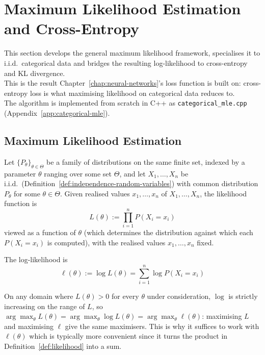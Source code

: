 \section{Maximum Likelihood Estimation and Cross-Entropy}
\label{sec:mle-cross-entropy}
	
	This section develops the general maximum likelihood framework, specialises it to i.i.d.\ categorical data and bridges the resulting log-likelihood to cross-entropy and KL divergence. \\
	
	This is the result Chapter~\ref{chap:neural-networks}'s loss function is built on: cross-entropy loss is what maximising likelihood on categorical data reduces to. \\
	
	The algorithm is implemented from scratch in C++ as \texttt{categorical\_mle.cpp} (Appendix~\ref{app:categorical-mle}).
	
	\subsection{Maximum Likelihood Estimation}
		
		\begin{definition}
			\label{def:likelihood}
			Let $\{P_\theta\}_{\theta\in\Theta}$ be a family of distributions on the same finite set, indexed by a parameter $\theta$ ranging over some set $\Theta$, and let $X_1,\dots,X_n$ be i.i.d.\ (Definition~\ref{def:independence-random-variables}) with common distribution $P_\theta$ for some $\theta\in\Theta$. Given realised values $x_1,\dots,x_n$ of $X_1,\dots,X_n$, the likelihood function is
			\[
				L(\theta) := \prod_{i=1}^n P(X_i=x_i)
			\]
			viewed as a function of $\theta$ (which determines the distribution against which each $P(X_i=x_i)$ is computed), with the realised values $x_1,\dots,x_n$ fixed.
		\end{definition}
		
		\begin{definition}
			\label{def:log-likelihood}
			The log-likelihood is
			\[
				\ell(\theta) := \log L(\theta) = \sum_{i=1}^n \log P(X_i=x_i)
			\]
		\end{definition}
		
		\begin{remark}
			\label{rem:log-preserves-argmax}
			On any domain where $L(\theta) > 0$ for every $\theta$ under consideration, $\log$ is strictly increasing on the range of $L$, so $\arg\max_\theta L(\theta) = \arg\max_\theta \log L(\theta) = \arg\max_\theta \ell(\theta)$: maximising $L$ and maximising $\ell$ give the same maximisers. This is why it suffices to work with $\ell(\theta)$ which is typically more convenient since it turns the product in Definition~\ref{def:likelihood} into a sum.
		\end{remark}
		
